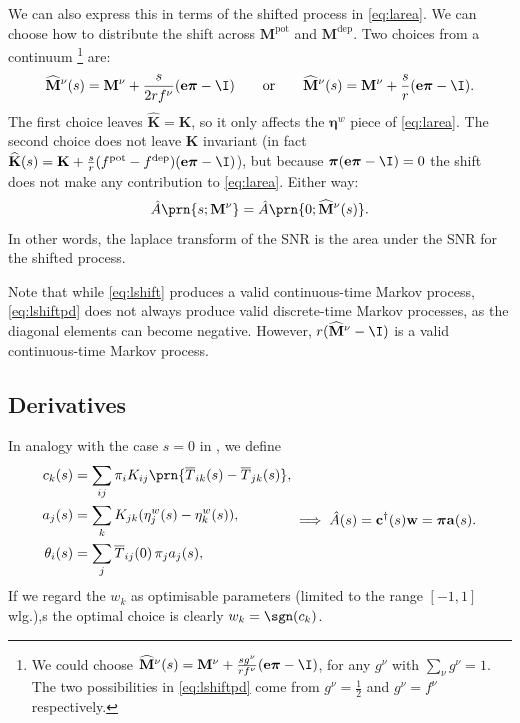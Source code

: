 \documentclass[12pt]{article}
\newcommand{\onev}{\mathbf{e}}
\newcommand{\eqm}{\pi}
\newcommand{\eq}{\boldsymbol{\eqm}}
\newcommand{\fptm}{T}
\newcommand{\fptbm}{\overline{\fptm}}
\newcommand{\etwm}{\eta^w}
\newcommand{\etw}{\boldsymbol{\eta}^w}
\newcommand{\thbm}{\theta}
\newcommand{\wm}{w}
\newcommand{\w}{\mathbf{\wm}}
\newcommand{\MMdm}{M}
\newcommand{\MMd}{\mathbf{\MMdm}}
\newcommand{\encm}{K}
\newcommand{\enc}{\mathbf{\encm}}
\newcommand{\pot}{^{\text{pot}}}
\newcommand{\dep}{^{\text{dep}}}
\newcommand{\shift}[1]{\widehat{#1}}
\begin{document}
We can also express this in terms of the shifted process in \cref{eq:larea}.
We can choose how to distribute the shift across \(\MMd \pot\) and \(\MMd \dep\).
Two choices from a continuum%
\footnote{We could choose \( \shift{\MMd}^\nu(s) = \MMd^\nu + \frac{s g^\nu}{r f^\nu} (\onev \eq - \I) \), for any \(g^\nu \) with \( \sum_\nu g^\nu = 1 \).
The two possibilities in \cref{eq:lshiftpd} come from \(g^\nu = \frac{1}{2}\) and \(g^\nu = f^\nu\) respectively.}
are:
%
\begin{equation}\label{eq:lshiftpd}
  \shift{\MMd}^\nu(s) = \MMd^\nu + \frac{s}{2 r f^\nu} (\onev \eq - \I)
  \qquad \text{or} \qquad
  \shift{\MMd}^\nu(s) = \MMd^\nu + \frac{s}{r} (\onev \eq - \I).
\end{equation}
%
The first choice leaves \( \shift{\enc} = \enc \), so it only affects the \(\etw\) piece of \cref{eq:larea}.
The second choice does not leave \(\enc\) invariant (in fact \( \shift{\enc}(s) = \enc + \frac{s}{r} (f\pot - f\dep) (\onev \eq - \I) \)), but because \( \eq (\onev \eq - \I) = 0 \) the shift does not make any contribution to \cref{eq:larea}.
Either way:
%
\begin{equation}\label{eq:lareashift}
  \hat{A}\prn{s; \MMd^\nu} = \hat{A}\prn{0; \shift{\MMd}^\nu(s)}.
\end{equation}
%
In other words, the laplace transform of the SNR is the area under the SNR for the shifted process.

Note that while \cref{eq:lshift} produces a valid continuous-time Markov process, \cref{eq:lshiftpd} does not always produce valid discrete-time Markov processes, as the diagonal elements can become negative.
However, \(r (\shift{\MMd}^\nu - \I)\) is a valid continuous-time Markov process.


\subsection{Derivatives}\label{sec:lderiv}

In analogy with the case \(s=0\) in \cite{Lahiri2013synapse}, we define
%
\begin{equation}\label{eq:lareacoeffs}
  \begin{aligned}
    {c}_k(s) &= \sum_{ij} \eqm_i \encm_{ij} \prn{\fptbm_{ik}(s)-\fptbm_{jk}(s)}, \\
    {a}_j(s) &= \sum_{k} \encm_{jk} (\etwm_{j}(s) - \etwm_{k}(s)), \\
    \thbm_i(s) &= \sum_j \fptbm_{ij}(0)\, \eqm_j {a}_j(s), \\
  \end{aligned}
    \implies
    \hat{A}(s) 
      = \mathbf{c}^\dag(s) \w
      = \eq \mathbf{a}(s).
\end{equation}
%
If we regard the \(\wm_k\) as optimisable parameters (limited to the range \( [-1,1] \) wlg.),s the optimal choice is clearly \( \wm_k = \sgn(c_k) \).
\end{document}
